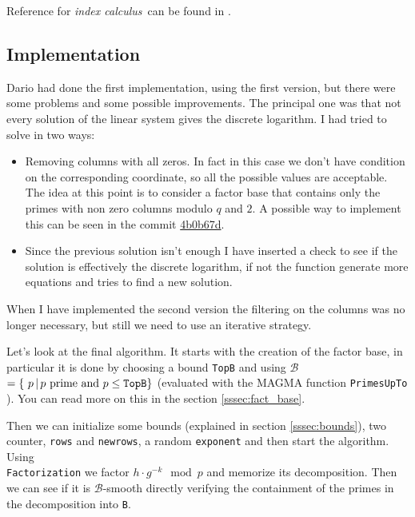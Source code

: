 \documentclass{article}
\newcommand{\BB}{\mathcal{B}}
\theoremstyle{plain}
\theoremstyle{remark}
\theoremstyle{definition}
\begin{document}
Reference for \textit{index calculus} can be found in \cite[Section 7.2.4]{stinson}.

\subsection{Implementation}

Dario had done the first implementation, using the first version, but there were some problems and some possible improvements. The principal one was that not every solution of the linear system gives the discrete logarithm. I had tried to solve in two ways:
\begin{itemize}
	\item Removing columns with all zeros. In fact in this case we don't have condition on the corresponding coordinate, so all the possible values are acceptable. The idea at this point is to consider a factor base that contains only the primes with non zero columns modulo $q$ and $2$. A possible way to implement this can be seen in the commit \href{https://github.com/giacomoborin/project2_MAGMA/pull/30/commits/4b0b67d0dcbe51f01058c64a06a1c39fdb5cf56e}{4b0b67d}.
	\item Since the previous solution isn't enough I have inserted a check to see if the solution is effectively the discrete logarithm, if not the function generate more equations and tries to find a new solution.  
\end{itemize}

When I have implemented the second version the filtering on the columns was no longer necessary, but still we need to use an iterative strategy. 

Let's look at the final algorithm. It starts with the creation of the factor base, in particular it is done by choosing a bound \texttt{TopB} and using $\BB $$= \{ p \,|\, p \text{ prime and } p \leq \verb|TopB|\}$ (evaluated with the MAGMA function \texttt{PrimesUpTo} ). You can read more on this in the section \ref{sssec:fact_base}. 

Then we can initialize some bounds (explained in section \ref{sssec:bounds}), two counter, \texttt{rows} and \texttt{newrows}, a random \texttt{exponent} and then start the algorithm. Using \\ \texttt{Factorization} we factor $h\cdot g^{-k} \mod p$ and memorize its decomposition. Then we can see if it is $\BB$-smooth directly verifying the containment of the primes in the decomposition into \texttt{B}.
\end{document}
